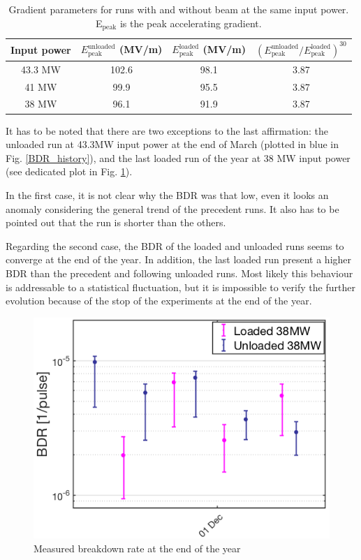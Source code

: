 \begin{table}[h]
  \centering
    \begin{tabular}{ c c c c }
    \hline
    \hline
    Input power 		&		$E^\text{unloaded} _\text{peak}$ (MV/m)		& 	$E^\text{loaded} _\text{peak}$ (MV/m)		&	$\left ( E^\text{unloaded} _\text{peak} / E^\text{loaded} _\text{peak} \right )^{30}$	\\
    \hline
    43.3 MW		&		102.6 								&	98.1									&	3.87		\\
    41 MW			&		99.9 									&	95.5									&	3.87		\\
    38 MW			&		96.1 									&	91.9									&	3.87		\\
    \hline
    \hline
    \end{tabular}
\caption{Gradient parameters for runs with and without beam at the same input power. E$_\text{peak}$ is the peak accelerating gradient.  }
\label{param_var_p}
\end{table}

It has to be noted that there are two exceptions to the last affirmation: the unloaded run at 43.3MW input power at the end of March (plotted in blue in Fig. \ref{BDR_history}), and the last loaded run of the year at 38 MW input power (see dedicated plot in Fig. \ref{BD_prob_last_raise}). 

In the first case, it is not clear why the BDR was that low, even it looks an anomaly considering the general trend of the precedent runs. It also has to be pointed out that the run is shorter than the others.

Regarding the second case, the BDR of the loaded and unloaded runs seems to converge at the end of the year. In addition, the last loaded run present a higher BDR than the precedent and following unloaded runs. Most likely this behaviour is addressable to a statistical fluctuation, but  it is impossible to verify the further evolution because of the stop of the experiments at the end of the year.

\begin{figure}[h]
\centering 
\includegraphics[scale=0.55]{pictures/BDR_last_part_year.png}
\caption{Measured breakdown rate at the end of the year}
\label{BD_prob_last_raise}
\end{figure}





